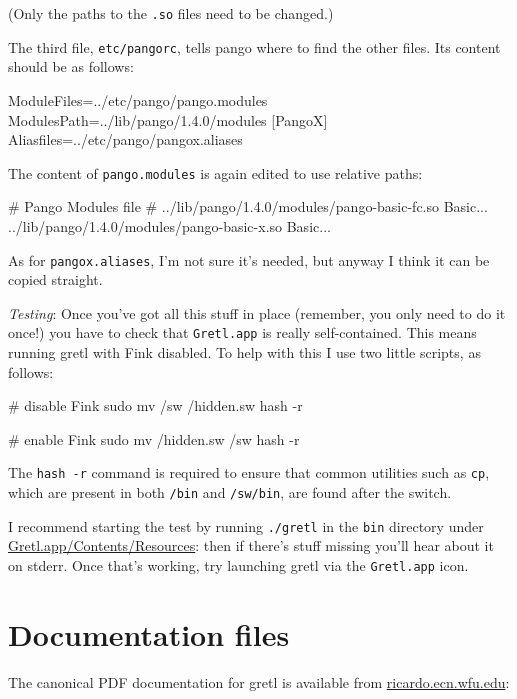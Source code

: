 \documentclass{article}
\begin{document}
(Only the paths to the \texttt{.so} files need to be changed.)

The third file, \texttt{etc/pangorc}, tells pango where to find the
other files.  Its content should be as follows:

\begin{code}
[Pango]
ModuleFiles=../etc/pango/pango.modules
ModulesPath=../lib/pango/1.4.0/modules
[PangoX]
Aliasfiles=../etc/pango/pangox.aliases
\end{code}

The content of \texttt{pango.modules} is again edited
to use relative paths:

\begin{code}
# Pango Modules file
#
../lib/pango/1.4.0/modules/pango-basic-fc.so Basic...
../lib/pango/1.4.0/modules/pango-basic-x.so Basic...
\end{code}

As for \texttt{pangox.aliases}, I'm not sure it's needed, but anyway I
think it can be copied straight.

\textit{Testing}: Once you've got all this stuff in place (remember,
you only need to do it once!) you have to check that
\texttt{Gretl.app} is really self-contained.  This means running gretl
with Fink disabled.  To help with this I use two little scripts, as
follows:

\begin{code}
# disable Fink
sudo mv /sw /hidden.sw
hash -r

# enable Fink
sudo mv /hidden.sw /sw
hash -r
\end{code}

The \texttt{hash -r} command is required to ensure that common
utilities such as \texttt{cp}, which are present in both \texttt{/bin}
and \texttt{/sw/bin}, are found after the switch.

I recommend starting the test by running \texttt{./gretl} in the
\texttt{bin} directory under \url{Gretl.app/Contents/Resources}: then
if there's stuff missing you'll hear about it on stderr.  Once that's
working, try launching gretl via the \texttt{Gretl.app} icon.

\section{Documentation files}

The canonical PDF documentation for gretl is available from
\url{ricardo.ecn.wfu.edu}:

\end{document}
